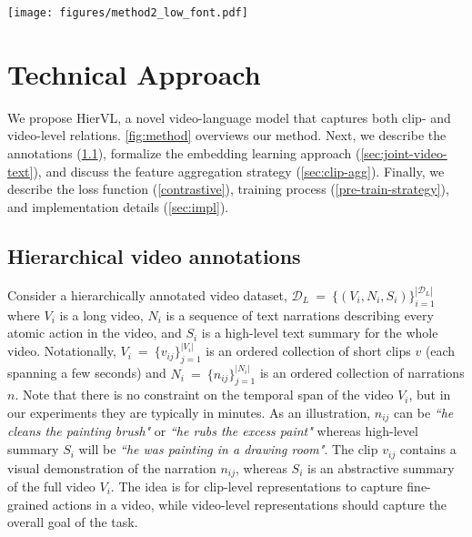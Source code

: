 \documentclass[10pt,twocolumn,letterpaper]{article}
\newcommand{\modelname}[0]{{HierVL}}
\begin{document}
\begin{figure*}[t]
\centering
\texttt{[image: figures/method2\_low\_font.pdf]}
\caption{Schematic representation of our proposed approach. In the clip-level contrastive learning setup (top), we match video clips with their corresponding narrations. The selected clips in one batch are from different videos, as shown. In our novel parent-level contrastive learning setup (bottom), we sample short-term features and aggregate them into a long-term representation followed by contrastive matching with the summary feature. These clips are sampled from the same video. Note that $f_v$ and $f_n$ are common in both stages, and also trainable in both. (For simplicity, figure only shows positive pairs in the contrastive setup.)}
\label{fig:method}
\vspace{-0.10in}
\end{figure*}

\section{Technical Approach}
\label{sec:method}

We propose \modelname, a novel video-language model that captures both clip- and video-level relations. \cref{fig:method} overviews our method. Next, we describe the annotations (\cref{sec:video-annotations}), formalize the embedding learning approach (\cref{sec:joint-video-text}), and discuss the feature aggregation strategy (\cref{sec:clip-agg}).  
Finally, we describe the loss function (\cref{contrastive}), 
training process (\cref{pre-train-strategy}), and implementation details (\cref{sec:impl}).

\subsection{Hierarchical video annotations} 
\label{sec:video-annotations}

Consider a hierarchically annotated video dataset, $\mathcal{D}_L~=~\{ (V_i, N_i, S_i) \}_{i=1}^{|\mathcal{D}_L|}$ where $V_i$ is a long video, $N_i$ is a sequence of text narrations describing every atomic action in the video, and $S_i$ is a high-level text summary for the whole video. Notationally, $V_i~=~\{v_{ij}\}_{j=1}^{|V_i|}$ is an ordered collection of short clips $v$ (each spanning a few seconds) and $N_i~=~\{n_{ij}\}_{j=1}^{|N_i|}$ is an ordered collection of narrations $n$. 
Note that there is no constraint on the temporal span of the video $V_i$, but in our experiments they are
typically in minutes. As an illustration, $n_{ij}$ can be \textit{``he cleans the painting brush"} or \textit{``he rubs the excess paint"} whereas high-level summary $S_i$ will be \textit{``he was painting in a drawing room"}. The clip $v_{ij}$ contains a visual demonstration of the narration $n_{ij}$, whereas $S_i$ is an abstractive summary of the full video $V_i$. 
The idea is for clip-level representations to capture fine-grained actions in a video, while video-level representations should capture the overall goal of the task.
\end{document}
